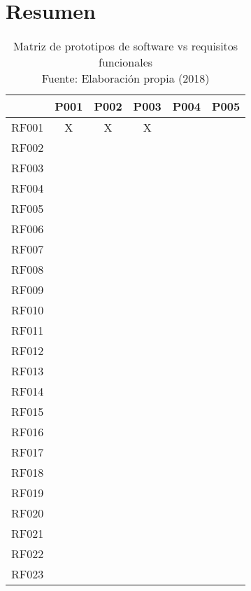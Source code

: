 \section{Resumen}


\begin{table}[]
\centering
\captionsetup{justification=centering}
\caption[Matriz de prototipos de software vs requisitos funcionales]{Matriz de prototipos de software vs requisitos funcionales \\ Fuente: Elaboración propia (2018)}
\label{table:RF-summary}
\begin{tabular}{|c|c|c|c|c|c|}
\hline
 & P001 & P002 & P003 & P004 & P005 \\ \hline
RF001 & X & X & X &  &  \\ \hline
RF002 &  &  &  &  &  \\ \hline
RF003 &  &  &  &  &  \\ \hline
RF004 &  &  &  &  &  \\ \hline
RF005 &  &  &  &  &  \\ \hline
RF006 &  &  &  &  &  \\ \hline
RF007 &  &  &  &  &  \\ \hline
RF008 &  &  &  &  &  \\ \hline
RF009 &  &  &  &  &  \\ \hline
RF010 &  &  &  &  &  \\ \hline
RF011 &  &  &  &  &  \\ \hline
RF012 &  &  &  &  &  \\ \hline
RF013 &  &  &  &  &  \\ \hline
RF014 &  &  &  &  &  \\ \hline
RF015 &  &  &  &  &  \\ \hline
RF016 &  &  &  &  &  \\ \hline
RF017 &  &  &  &  &  \\ \hline
RF018 &  &  &  &  &  \\ \hline
RF019 &  &  &  &  &  \\ \hline
RF020 &  &  &  &  &  \\ \hline
RF021 &  &  &  &  &  \\ \hline
RF022 &  &  &  &  &  \\ \hline
RF023 &  &  &  &  &  \\ \hline
\end{tabular}
\end{table}


